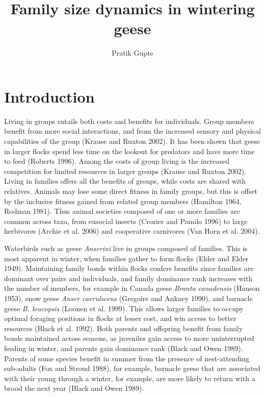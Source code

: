\documentclass[10pt,twocolumn]{paper}
\title{Family size dynamics in wintering geese}
\author{Pratik Gupte}
\date{}
\begin{document}
\maketitle

\section{Introduction}\label{introduction}

Living in groups entails both costs and benefits for individuals. Group
members benefit from more social interactions, and from the increased
sensory and physical capabilities of the group (Krause and Ruxton 2002).
It has been shown that geese in larger flocks spend less time on the
lookout for predators and have more time to feed (Roberts 1996). Among
the costs of group living is the increased competition for limited
resources in larger groups (Krause and Ruxton 2002). Living in families
offers all the benefits of groups, while costs are shared with
relatives. Animals may lose some direct fitness in family groups, but
this is offset by the inclusive fitness gained from related group
members (Hamilton 1964, Rodman 1981). Thus animal societies composed of
one or more families are common across taxa, from eusocial insects
(Crozier and Pamilo 1996) to large herbivores (Archie et al. 2006) and
cooperative carnivores (Van Horn et al. 2004).

Waterbirds such as geese \emph{Anserini} live in groups composed of
families. This is most apparent in winter, when families gather to form
flocks (Elder and Elder 1949). Maintaining family bonds within flocks
confers benefits since families are dominant over pairs and individuals,
and family dominance rank increases with the number of members, for
example in Canada geese \emph{Branta canadensis} (Hanson 1953), snow
geese \emph{Anser caerulscens} (Gregoire and Ankney 1990), and barnacle
geese \emph{B. leucopsis} (Loonen et al. 1999). This allows larger
families to occupy optimal foraging positions in flocks at lesser cost,
and win access to better resources (Black et al. 1992). Both parents and
offspring benefit from family bonds maintained across seasons, as
juveniles gain access to more uninterrupted feeding in winter, and
parents gain dominance rank (Black and Owen 1989). Parents of some
species benefit in summer from the presence of nest-attending sub-adults
(Fox and Stroud 1988), for example, barnacle geese that are associated
with their young through a winter, for example, are more likely to
return with a brood the next year (Black and Owen 1989).
\end{document}
